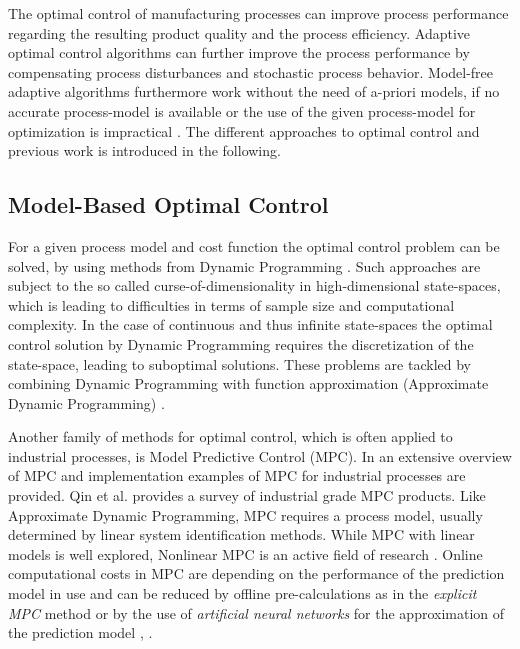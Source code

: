 The optimal control of manufacturing processes can improve process performance regarding the resulting product quality and the process efficiency. Adaptive optimal control algorithms can further improve the process performance by compensating process disturbances and stochastic process behavior. Model-free adaptive algorithms furthermore work without the need of a-priori models, if no accurate process-model is available or the use of the given process-model for optimization is impractical \cite{Sutton1992}. The different approaches to optimal control and previous work is introduced in the following.

\subsection{Model-Based Optimal Control}
\label{introDP}

For a given process model and cost function the optimal control problem can be solved, by using methods from Dynamic Programming \cite{bellman2013reprint}. Such approaches are subject to the so called curse-of-dimensionality in high-dimensional state-spaces, which is leading to difficulties in terms of sample size and computational complexity. In the case of continuous and thus infinite state-spaces the optimal control solution by Dynamic Programming requires the discretization of the state-space, leading to suboptimal solutions. These problems are tackled by combining Dynamic Programming with function approximation (Approximate Dynamic Programming) \cite{powell2007approximate}.  

Another family of methods for optimal control, which is often applied to industrial processes, is Model Predictive Control (MPC). In \cite{camacho2013model} an extensive overview of MPC and implementation examples of MPC for industrial processes are provided. Qin et al. \cite{Qin2003} provides a survey of industrial grade MPC products. Like Approximate Dynamic Programming, MPC requires a process model, usually determined by linear system identification methods. While MPC with linear models is well explored, Nonlinear MPC is an active field of research \cite{grune2011nonlinear}. Online computational costs in MPC are depending on the performance of the prediction model in use and can be reduced by offline pre-calculations as in the \textit{explicit MPC} method \cite{Alessio2009} or by the use of \textit{artificial neural networks} for the approximation of the prediction model \cite{Saint-Donat1991}, \cite{Akesson2006}.

